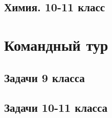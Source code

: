 \documentclass[a4paper,12pt,oneside]{book}
\begin{document}
\section{Химия. 10-11 класс}


\chapter{Командный тур}

\section{Задачи 9 класса} 



\section{Задачи 10-11 класса}


\end{document}
